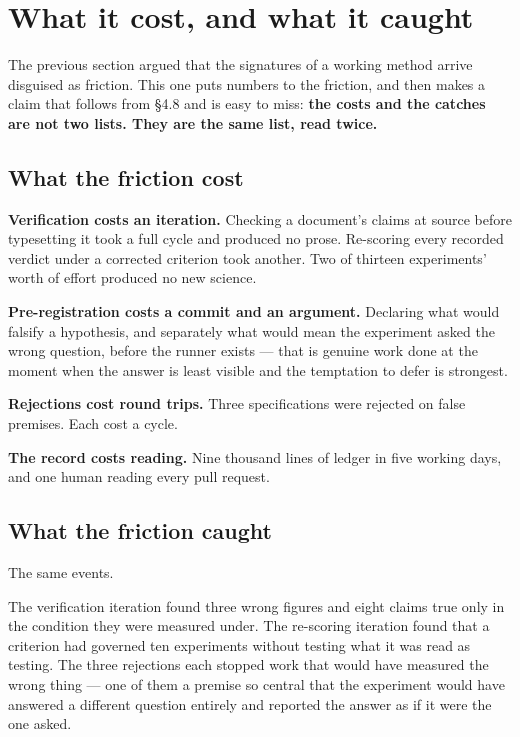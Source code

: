 \section{What it cost, and what it caught}

The previous section argued that the signatures of a working method arrive disguised as friction. This one puts numbers to the friction, and then makes a claim that follows from \S4.8 and is easy to miss: \textbf{the costs and the catches are not two lists. They are the same list, read twice.}

\subsection{What the friction cost}

\textbf{Verification costs an iteration.} Checking a document's claims at source before typesetting it took a full cycle and produced no prose. Re-scoring every recorded verdict under a corrected criterion took another. Two of thirteen experiments' worth of effort produced no new science.

\textbf{Pre-registration costs a commit and an argument.} Declaring what would falsify a hypothesis, and separately what would mean the experiment asked the wrong question, before the runner exists --- that is genuine work done at the moment when the answer is least visible and the temptation to defer is strongest.

\textbf{Rejections cost round trips.} Three specifications were rejected on false premises. Each cost a cycle.

\textbf{The record costs reading.} Nine thousand lines of ledger in five working days, and one human reading every pull request.

\subsection{What the friction caught}

The same events.

The verification iteration found three wrong figures and eight claims true only in the condition they were measured under. The re-scoring iteration found that a criterion had governed ten experiments without testing what it was read as testing. The three rejections each stopped work that would have measured the wrong thing --- one of them a premise so central that the experiment would have answered a different question entirely and reported the answer as if it were the one asked.

